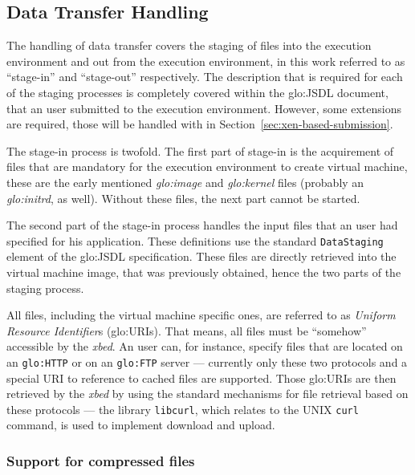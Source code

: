 \subsection{Data Transfer Handling}
\label{sec:xbed:data-transfer}

The  handling  of data  transfer  covers the  staging  of  files into  the
execution environment and out from the execution environment, in this work
referred   to  as  ``stage-in''   and  ``stage-out''   respectively.   The
description  that  is  required  for  each of  the  staging  processes  is
completely  covered  within  the  \gls{glo:JSDL} document,  that  an  user
submitted  to the  execution  environment.  However,  some extensions  are
required,       those       will       be      handled       with       in
Section~\ref{sec:xen-based-submission}.

The  stage-in process  is  twofold.  The  first  part of  stage-in is  the
acquirement of files  that are mandatory for the  execution environment to
create    virtual    machine,    these    are    the    early    mentioned
\emph{\gls{glo:image}}  and  \emph{\gls{glo:kernel}}  files  (probably  an
\emph{\gls{glo:initrd}},  as well).   Without these  files, the  next part
cannot be started.

The second  part of the stage-in  process handles the input  files that an
user had specified for his application. These definitions use the standard
\texttt{DataStaging}  element of  the \gls{glo:JSDL}  specification. These
files  are directly  retrieved into  the virtual  machine image,  that was
previously obtained, hence the two parts of the staging process.

All files, including the virtual machine specific ones, are referred to as
\emph{Uniform  Resource  Identifier}s  (\gls{glo:URI}s). That  means,  all
files must be ``somehow'' accessible by the \emph{xbed}.  An user can, for
instance, specify files that  are located on an \texttt{\gls{glo:HTTP}} or
on an \texttt{\gls{glo:FTP}} server --- currently only these two protocols
and  a special  URI to  reference to  cached files  are  supported.  Those
\gls{glo:URI}s are then retrieved by the \emph{xbed} by using the standard
mechanisms for  file retrieval  based on these  protocols ---  the library
\texttt{libcurl}, which relates to the UNIX \texttt{curl} command, is used
to implement download and upload.

\subsubsection{Support for compressed files}

